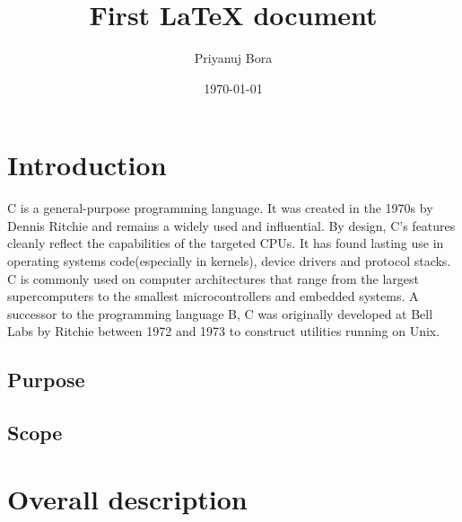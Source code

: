 \documentclass{article}
\title{First LaTeX document}
\author{Priyanuj Bora}
\date{\today}
\begin{document}
	\maketitle %
	
	\section{Introduction}
	C is a general-purpose programming language. It was created in the 1970s by Dennis Ritchie and remains a widely used and influential. By design, C's features cleanly reflect the capabilities of the targeted CPUs. It has found lasting use in operating systems code(especially in kernels), device drivers and protocol stacks. C is commonly used on computer architectures that range from the largest supercomputers to the smallest microcontrollers and embedded systems. A successor to the programming language B, C was originally developed at Bell Labs by Ritchie between 1972 and 1973 to construct utilities running on Unix.
	
	\subsection{Purpose}
	
	\subsection{Scope}
	
	\section{Overall description}
\end{document}
